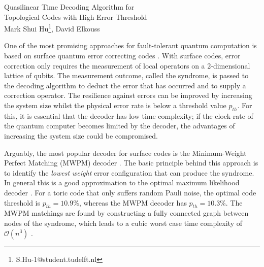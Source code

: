 \documentclass[11pt, a4paper, twoside, titlepage ,dvipsnames]{report}
\begin{document}
\begingroup
    \centering
    \Large Quasilinear Time Decoding Algorithm for \\Topological Codes with High Error Threshold\\[.5em]
    \large Mark Shui Hu\footnote{S.Hu-1@student.tudelft.nl}, David Elkouss\par
\endgroup
\vspace{2em}
One of the most promising approaches for fault-tolerant quantum computation is based on surface quantum error correcting codes \cite{dennis2002topological, kitaev2003fault}. With surface codes, error correction only requires the measurement of local operators on a 2-dimensional lattice of qubits. The measurement outcome, called the syndrome, is passed to the decoding algorithm to deduct the error that has occurred and to supply a correction operator. 
The resilience against errors can be improved by increasing the system size whilst the physical error rate is below a threshold value $p_{th}$. For this, it is essential that the decoder has low time complexity; if the clock-rate of the quantum computer becomes limited by the decoder, the advantages of increasing the system size could be compromised.

Arguably, the most popular decoder for surface codes is the Minimum-Weight Perfect Matching (MWPM) decoder \cite{dennis2002topological}. The basic principle behind this approach is to identify the \emph{lowest weight} error configuration that can produce the syndrome. In general this is a good approximation to the optimal maximum likelihood decoder \cite{bravyi2014efficient}. For a toric code that only suffers random Pauli noise, the optimal code threshold is $p_{th} = 10.9\%$, whereas the MWPM decoder has $p_{th} = 10.3\%$. The MWPM matchings are found by constructing a fully connected graph between nodes of the syndrome, which leads to a cubic worst case time complexity of $\mathcal{O}(n^3)$ \cite{kolmogorov2009blossom}.
\end{document}
